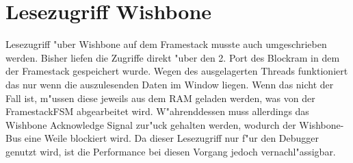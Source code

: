 \section{Lesezugriff Wishbone}
Lesezugriff "uber Wishbone auf dem Framestack musste auch umgeschrieben werden. Bisher liefen die Zugriffe direkt "uber den 2. Port des Blockram in dem der Framestack gespeichert wurde. Wegen des ausgelagerten Threads funktioniert das nur wenn die auszulesenden Daten im Window liegen. Wenn das nicht der Fall ist, m"ussen diese jeweils aus dem RAM geladen werden, was von der FramestackFSM abgearbeitet wird. W"ahrenddessen muss allerdings das Wishbone Acknowledge Signal zur"uck gehalten werden, wodurch der Wishbone-Bus eine Weile blockiert wird. Da dieser Lesezugriff nur f"ur den Debugger genutzt wird, ist die Performance bei diesen Vorgang jedoch vernachl"assigbar. 




